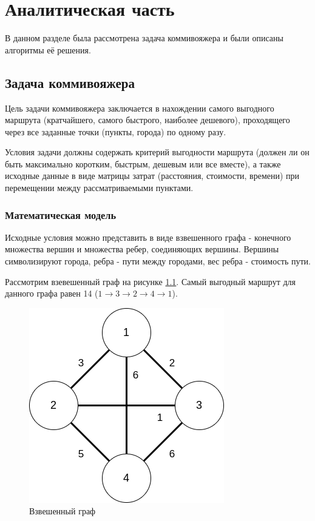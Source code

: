 \chapter{Аналитическая часть}
В данном разделе была рассмотрена задача коммивояжера и были описаны алгоритмы её решения.

\section{Задача коммивояжера}

Цель задачи коммивояжера \cite{model} заключается в нахождении самого выгодного маршрута (кратчайшего, самого быстрого, наиболее дешевого), проходящего через все заданные точки (пункты, города) по одному разу.

Условия задачи должны содержать критерий выгодности маршрута (должен ли он быть максимально коротким, быстрым, дешевым или все вместе), а также исходные данные в виде матрицы затрат (расстояния, стоимости, времени) при перемещении между рассматриваемыми пунктами.

\subsection{Математическая модель}
Исходные условия можно представить в виде взвешенного графа - конечного множества вершин и множества ребер, соединяющих вершины. Вершины символизируют города, ребра - пути между городами, вес ребра - стоимость пути.

Рассмотрим взевешенный граф на рисунке \ref{img:graph}. Самый выгодный маршрут для данного графа равен 14 ($1 \rightarrow 3 \rightarrow 2 \rightarrow 4 \rightarrow 1$).

\begin{figure}[h]
	\begin{center}
		\includegraphics[scale=0.52]{img/graph.png}
	\end{center}
	\captionsetup{justification=centering}
	\caption{Взвешенный граф}
	\label{img:graph}
\end{figure}

